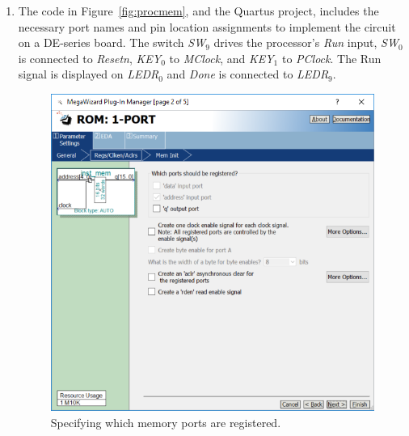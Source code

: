 \documentclass[epsfig,10pt,fullpage]{article}
\begin{document}
\begin{enumerate}
\item The code in Figure~\ref{fig:procmem}, and the Quartus project, includes the necessary 
port names and pin location assignments to implement the circuit on a DE-series board.
The switch {\it SW}$_{9}$ drives the processor's {\it Run} input, {\it SW}$_0$ is
connected to {\it Resetn}, {\it KEY}$_0$ to {\it MClock}, and {\it KEY}$_1$ to {\it PClock}.
The Run signal is displayed on {\it LEDR}$_{0}$ and {\it Done} is connected to {\it LEDR}$_{9}$.
\begin{figure}[H]
	\begin{center}
		\includegraphics[scale=1.0]{figures/figure6.png}
	\end{center}
	\caption{Specifying which memory ports are registered.}
	\label{fig:fig6}
\end{figure}


\end{enumerate}
\end{document}
